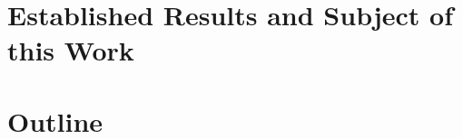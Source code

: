





\section{Established Results and Subject of this Work}
\label{sec:into.results}

%



\section{Outline}
\label{sec:into.outline}

